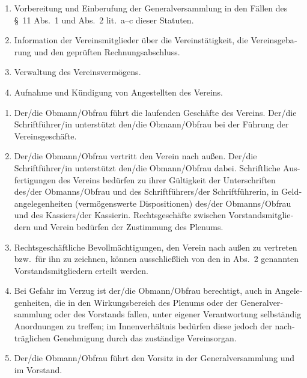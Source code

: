 \begin{otherlanguage}{german}
\begin{enumerate}[statutenenum]
    \item Vorbereitung und Einberufung der Generalversammlung in den Fällen des \S\ 11 Abs.\ 1 und Abs.\ 2 lit.\ a--c dieser Statuten.

    \item Information der Vereinsmitglieder über die Vereinstätigkeit, die Vereinsgebarung und den geprüften Rechnungsabschluss.

    \item Verwaltung des Vereinsvermögens.

    \item Aufnahme und Kündigung von Angestellten des Vereins.
\end{enumerate}


\begin{enumerate}[statutenenum]
    \item Der/die Obmann/Obfrau führt die laufenden Geschäfte des Vereins.
        Der/die Schriftführer/in unterstützt den/die Obmann/Obfrau bei der Führung der Vereinsgeschäfte.

    \item Der/die Obmann/Obfrau vertritt den Verein nach außen.
        Der/die Schriftführer/in unterstützt den/die Obmann/Obfrau dabei.
        Schriftliche Ausfertigungen des Vereins bedürfen zu ihrer Gültigkeit der Unterschriften des/der Obmanns/Obfrau und des Schriftführers/der Schriftführerin, in Geldangelegenheiten (vermögenswerte Dispositionen) des/der Obmanns/Obfrau und des Kassiers/der Kassierin.
        Rechtsgeschäfte zwischen Vorstandsmitgliedern und Verein bedürfen der Zustimmung des Plenums.

    \item Rechtsgeschäftliche Bevollmächtigungen, den Verein nach außen zu vertreten bzw.\ für ihn zu zeichnen, können ausschließlich von den in Abs.\ 2 genannten Vorstandsmitgliedern erteilt werden.

    \item Bei Gefahr im Verzug ist der/die Obmann/Obfrau berechtigt, auch in Angelegenheiten, die in den Wirkungsbereich des Plenums oder der Generalversammlung oder des Vorstands fallen, unter eigener Verantwortung selbständig Anordnungen zu treffen;
        im Innenverhältnis bedürfen diese jedoch der nachträglichen Genehmigung durch das zuständige Vereinsorgan.

    \item Der/die Obmann/Obfrau führt den Vorsitz in der Generalversammlung und im Vorstand.


\end{enumerate}
\end{otherlanguage}
